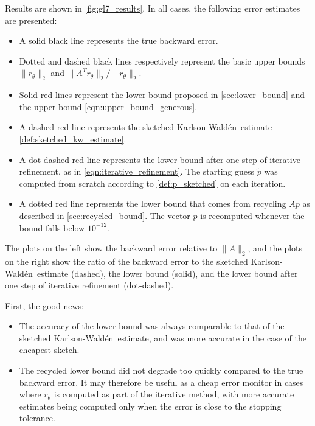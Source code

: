 \documentclass{article}
\newcommand{\ts}{^T}
\newcommand{\KW}{Karlson-Wald\'{e}n~}
\begin{document}
Results are shown in \cref{fig:gl7_results}. In all cases, the following error estimates are presented:
\begin{itemize}
    \item A solid black line represents the true backward error.
    \item Dotted and dashed black lines respectively represent the basic upper bounds $\|r_\theta\|_2$ and $\|A\ts r_\theta\|_2/\|r_\theta\|_2$.
    \item Solid red lines represent the lower bound proposed in \cref{sec:lower_bound} and the upper bound \cref{eqn:upper_bound_generous}.
    \item A dashed red line represents the sketched \KW estimate \cref{def:sketched_kw_estimate}.
    \item A dot-dashed red line represents the lower bound after one step of iterative refinement, as in \cref{eqn:iterative_refinement}. The starting guess $\widetilde{p}$ was computed from scratch according to \cref{def:p_sketched} on each iteration. 
    \item A dotted red line represents the lower bound that comes from recycling $Ap$ as described in \cref{sec:recycled_bound}. The vector $p$ is recomputed whenever the bound falls below $10^{-12}$. 
\end{itemize}
The plots on the left show the backward error relative to $\|A\|_2$, and the plots on the right show the ratio of the backward error to the sketched \KW estimate (dashed), the lower bound (solid), and the lower bound after one step of iterative refinement (dot-dashed).

First, the good news:
\begin{itemize}
    \item The accuracy of the lower bound was always comparable to that of the sketched \KW estimate, and was more accurate in the case of the cheapest sketch.
    \item The recycled lower bound did not degrade too quickly compared to the true backward error. It may therefore be useful as a cheap error monitor in cases where $r_\theta$ is computed as part of the iterative method, with more accurate estimates being computed only when the error is close to the stopping tolerance.
\end{itemize}
\end{document}
